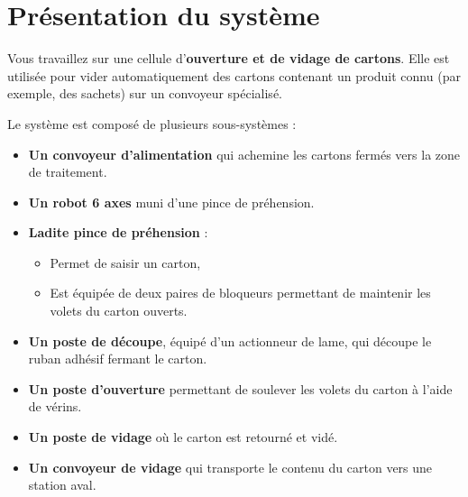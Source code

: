 
\section{Présentation du système}

Vous travaillez sur une cellule d'\textbf{ouverture et de vidage de cartons}. Elle est utilisée pour vider automatiquement des cartons contenant un produit connu (par exemple, des sachets) sur un convoyeur spécialisé.

Le système est composé de plusieurs sous-systèmes :
\begin{itemize}
    \item \textbf{Un convoyeur d'alimentation} qui achemine les cartons fermés vers la zone de traitement.
    \item \textbf{Un robot 6 axes} muni d'une pince de préhension. 
    \item \textbf{Ladite pince de préhension} : 
    \begin{itemize}
        \item Permet de saisir un carton,
        \item Est équipée de deux paires de bloqueurs permettant de maintenir les volets du carton ouverts.
    \end{itemize}
    \item \textbf{Un poste de découpe}, équipé d’un actionneur de lame, qui découpe le ruban adhésif fermant le carton.
    \item \textbf{Un poste d'ouverture} permettant de soulever les volets du carton à l’aide de vérins.
    \item \textbf{Un poste de vidage} où le carton est retourné et vidé.
    \item \textbf{Un convoyeur de vidage} qui transporte le contenu du carton vers une station aval.
\end{itemize}

